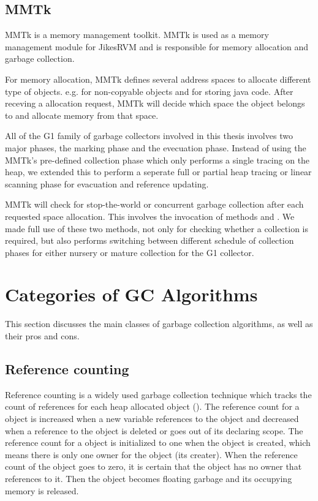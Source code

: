 \subsection{MMTk}

MMTk is a memory management toolkit.
MMTk is used as a memory management module for JikesRVM and is responsible for
memory allocation and garbage collection.

For memory allocation, MMTk defines several address spaces to
allocate different type of objects. e.g.  for non-copyable objects
and  for storing java code. After receving a allocation request,
MMTk will decide which space the object belongs to and allocate memory from that space.

All of the G1 family of garbage collectors involved in this thesis involves two major phases,
the marking phase and the evecuation phase.
Instead of using the MMTk's pre-defined 
collection phase which only performs a single tracing on the heap, we extended this
to perform a seperate full or partial heap tracing or linear scanning phase for
evacuation and reference updating.

MMTk will check for stop-the-world or concurrent garbage collection after each
requested space allocation.
This involves the invocation of methods 
and .
We made full use of these two methods,
not only for checking whether a collection is required,
but also performs switching between different schedule of collection phases
for either nursery or mature collection for the G1 collector.

\section{Categories of GC Algorithms}
\label{sec:gcalgorithms}

This section discusses the main classes of garbage collection algorithms, as well
as their pros and cons.

\subsection{Reference counting}

Reference counting is a widely used garbage collection technique which tracks the
count of references for each heap allocated object (\cite{detlefs2002lock}).
The reference count for a object is increased when a new variable references to
the object and decreased when a reference
to the object is deleted or goes out of its declaring scope. The reference count for
a object is initialized to one when the object is created, which means there is only one
owner for the object (its creater). When the reference count of the object goes
to zero, it is certain that the object has no owner that references to it. Then the
object becomes floating garbage and its occupying memory is released.

